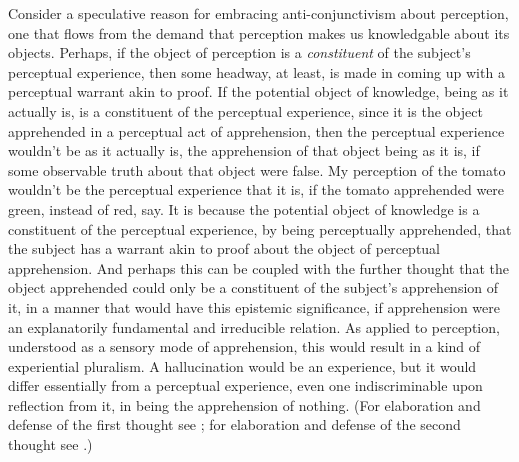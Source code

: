 \documentclass[12pt]{article}
\begin{document}
Consider a speculative reason for embracing anti-conjunctivism about perception, one that flows from the demand that perception makes us knowledgable about its objects. Perhaps, if the object of perception is a \emph{constituent} of the subject's perceptual experience, then some headway, at least, is made in coming up with a perceptual warrant akin to proof. If the potential object of knowledge, being as it actually is, is a constituent of the perceptual experience, since it is the object apprehended in a perceptual act of apprehension, then the perceptual experience wouldn't be as it actually is, the apprehension of that object being as it is, if some observable truth about that object were false. My perception of the tomato wouldn't be the perceptual experience that it is, if the tomato apprehended were green, instead of red, say. It is because the potential object of knowledge is a constituent of the perceptual experience, by being perceptually apprehended, that the subject has a warrant akin to proof about the object of perceptual apprehension. And perhaps this can be coupled with the further thought that the object apprehended could only be a constituent of the subject's apprehension of it, in a manner that would have this epistemic significance, if apprehension were an explanatorily fundamental and irreducible relation. As applied to perception, understood as a sensory mode of apprehension, this would result in a kind of experiential pluralism. A hallucination would be an experience, but it would differ essentially from a perceptual experience, even one indiscriminable upon reflection from it, in being the apprehension of nothing. (For elaboration and defense of the first thought see \citealt{Kalderon:2011fk}; for elaboration and defense of the second thought see \citealt{Kalderon:2012fk}.)
\end{document}
